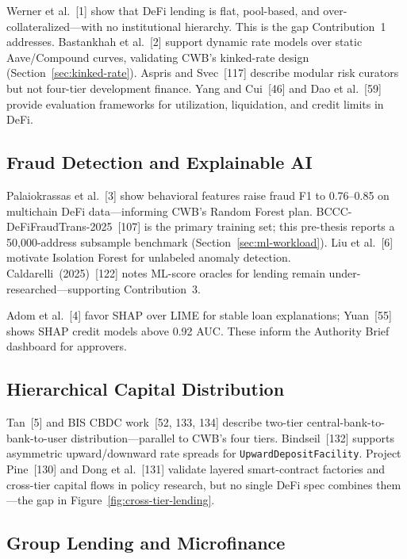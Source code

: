 \documentclass[12pt,a4paper]{report}
\begin{document}
Werner et al.~[1] show that DeFi lending is flat, pool-based, and over-collateralized---with no institutional hierarchy. This is the gap Contribution~1 addresses. Bastankhah et al.~[2] support dynamic rate models over static Aave/Compound curves, validating CWB's kinked-rate design (Section~\ref{sec:kinked-rate}). Aspris and Svec~[117] describe modular risk curators but not four-tier development finance. Yang and Cui~[46] and Dao et al.~[59] provide evaluation frameworks for utilization, liquidation, and credit limits in DeFi.

\subsection{Fraud Detection and Explainable AI}
\label{sec:lit-ml-oracle}

Palaiokrassas et al.~[3] show behavioral features raise fraud F1 to 0.76--0.85 on multichain DeFi data---informing CWB's Random Forest plan. BCCC-DeFiFraudTrans-2025~[107] is the primary training set; this pre-thesis reports a 50{,}000-address subsample benchmark (Section~\ref{sec:ml-workload}). Liu et al.~[6] motivate Isolation Forest for unlabeled anomaly detection. Caldarelli~(2025)~[122] notes ML-score oracles for lending remain under-researched---supporting Contribution~3.

Adom et al.~[4] favor SHAP over LIME for stable loan explanations; Yuan~[55] shows SHAP credit models above 0.92 AUC. These inform the Authority Brief dashboard for approvers.

\subsection{Hierarchical Capital Distribution}
\label{sec:lit-cross-tier}

Tan~[5] and BIS CBDC work~[52, 133, 134] describe two-tier central-bank-to-bank-to-user distribution---parallel to CWB's four tiers. Bindseil~[132] supports asymmetric upward/downward rate spreads for \texttt{UpwardDepositFacility}. Project Pine~[130] and Dong et al.~[131] validate layered smart-contract factories and cross-tier capital flows in policy research, but no single DeFi spec combines them---the gap in Figure~\ref{fig:cross-tier-lending}.

\subsection{Group Lending and Microfinance}
\end{document}
